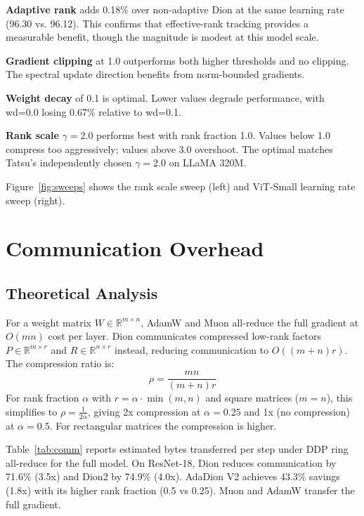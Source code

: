 \documentclass[10pt,twocolumn]{article}
\begin{document}
\textbf{Adaptive rank} adds 0.18\% over non-adaptive Dion at the same learning rate (96.30 vs. 96.12). This confirms that effective-rank tracking provides a measurable benefit, though the magnitude is modest at this model scale.

\textbf{Gradient clipping} at 1.0 outperforms both higher thresholds and no clipping. The spectral update direction benefits from norm-bounded gradients.

\textbf{Weight decay} of 0.1 is optimal. Lower values degrade performance, with wd=0.0 losing 0.67\% relative to wd=0.1.

\textbf{Rank scale} $\gamma = 2.0$ performs best with rank fraction 1.0. Values below 1.0 compress too aggressively; values above 3.0 overshoot. The optimal matches Tatsu's independently chosen $\gamma = 2.0$ on LLaMA 320M.

Figure~\ref{fig:sweeps} shows the rank scale sweep (left) and ViT-Small learning rate sweep (right).

\section{Communication Overhead}

\subsection{Theoretical Analysis}

For a weight matrix $W \in \mathbb{R}^{m \times n}$, AdamW and Muon all-reduce the full gradient at $O(mn)$ cost per layer. Dion communicates compressed low-rank factors $P \in \mathbb{R}^{m \times r}$ and $R \in \mathbb{R}^{n \times r}$ instead, reducing communication to $O((m+n)r)$. The compression ratio is:
\[
\rho = \frac{mn}{(m+n)r}
\]
For rank fraction $\alpha$ with $r = \alpha \cdot \min(m,n)$ and square matrices ($m = n$), this simplifies to $\rho = \frac{1}{2\alpha}$, giving 2x compression at $\alpha = 0.25$ and 1x (no compression) at $\alpha = 0.5$. For rectangular matrices the compression is higher.

Table~\ref{tab:comm} reports estimated bytes transferred per step under DDP ring all-reduce for the full model. On ResNet-18, Dion reduces communication by 71.6\% (3.5x) and Dion2 by 74.9\% (4.0x). AdaDion V2 achieves 43.3\% savings (1.8x) with its higher rank fraction (0.5 vs 0.25). Muon and AdamW transfer the full gradient.
\end{document}
